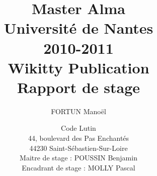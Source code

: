 \documentclass[12pt,a4paper,utf8x]{article}
\title
{
	\normalsize{Master Alma\\
	Université de Nantes\\
	2010-2011}\\
	\vspace{15mm}
	\Huge{Wikitty Publication}\\
	\normalsize{Rapport de stage}
}
\author{FORTUN Manoël\\
	\vspace{45mm}
}
\date{	
	\normalsize{Code Lutin\\
	44, boulevard des Pas Enchantés\\
	44230 Saint-Sébastien-Sur-Loire\\
	\vspace{5mm}	
	Maitre de stage : POUSSIN Benjamin \\
	Encadrant de stage : MOLLY Pascal
	}
}
\begin{document}
\maketitle

\clearpage

\newpage
\null

\newpage




\clearpage

\clearpage

\clearpage



\tableofcontents


\clearpage

\clearpage

\clearpage

\clearpage

\clearpage

\clearpage

\clearpage

\clearpage

\clearpage

\clearpage

\end{document}
